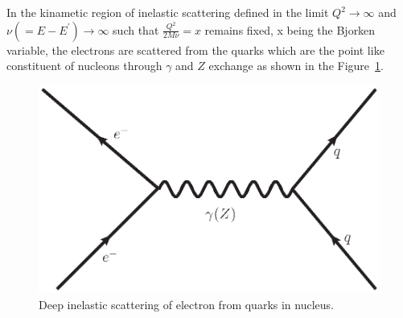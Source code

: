 In the kinametic region of inelastic scattering defined in the limit $Q^2\rightarrow \infty$ and $\nu(=E-E^\prime)\rightarrow \infty$  such that $\frac{Q^2}{2M\nu}=x$ remains fixed, x being the Bjorken  variable,  the  electrons are scattered from the quarks which are the point like  constituent of nucleons  through $\gamma$ and $Z$ exchange as shown in the Figure~\ref{chap9-fig4}. 
\begin{figure}[H]
\centering
\includegraphics[scale=0.35]{src/images/chap9/fig3.eps}
\caption{Deep inelastic scattering of electron from quarks in nucleus.}\label{chap9-fig4}
\end{figure}


